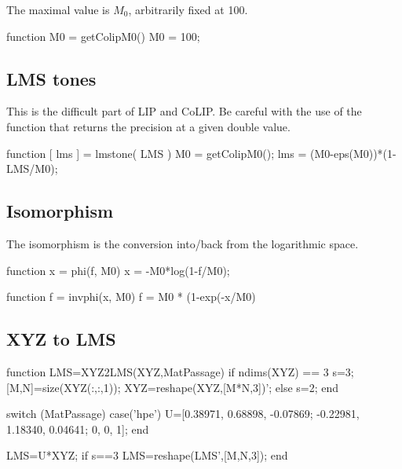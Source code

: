 \def\QRCODE{MASTER_mispa_TUT.IMG.colip_matlabqrcode.png}
\def\QRPAGE{http://www.iptutorials.science/tree/master/MASTER_mispa/TUT.IMG.colip/matlab}


The maximal value is $M_0$, arbitrarily fixed at 100.

\begin{matlab}function M0 = getColipM0()
M0 = 100;
\end{matlab}

\subsection{LMS tones}
This is the difficult part of LIP and CoLIP. Be careful with the use of the function  that returns the precision at a given double value.
\begin{matlab}
function [ lms ] = lmstone( LMS )
M0 = getColipM0();
lms = (M0-eps(M0))*(1-LMS/M0);  
\end{matlab}

\subsection{Isomorphism}
The isomorphism is the conversion into/back from the logarithmic space.
\begin{matlab}
function x = phi(f, M0)
x = -M0*log(1-f/M0);
\end{matlab}

\begin{matlab}
function f = invphi(x, M0)
f = M0 * (1-exp(-x/M0)
\end{matlab}

\subsection{XYZ to LMS}
\begin{matlab}

function LMS=XYZ2LMS(XYZ,MatPassage)
if ndims(XYZ) == 3
    s=3;
    [M,N]=size(XYZ(:,:,1)); 
    XYZ=reshape(XYZ,[M*N,3])';
else
    s=2;
end

switch (MatPassage)
    case('hpe')
    U=[0.38971, 0.68898, -0.07869; -0.22981, 1.18340, 0.04641; 0, 0, 1];
end  

LMS=U*XYZ;
if s==3
    LMS=reshape(LMS',[M,N,3]);
end
\end{matlab}

